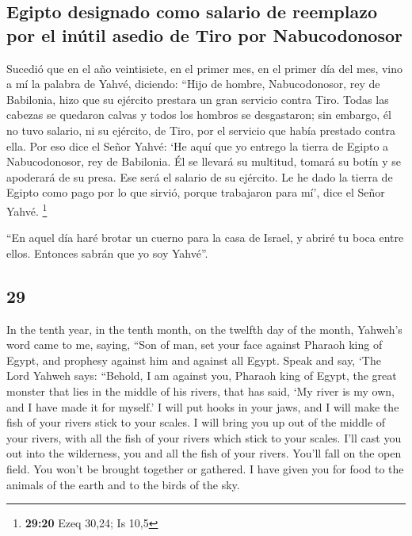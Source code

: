 \begin{paracol}{2}
\hypertarget{egipto-designado-como-salario-de-reemplazo-por-el-inuxfatil-asedio-de-tiro-por-nabucodonosor}{%
\subsection{Egipto designado como salario de reemplazo por el inútil
asedio de Tiro por
Nabucodonosor}\label{egipto-designado-como-salario-de-reemplazo-por-el-inuxfatil-asedio-de-tiro-por-nabucodonosor}}

 Sucedió que en el año veintisiete, en el primer mes, en
el primer día del mes, vino a mí la palabra de Yahvé, diciendo:
 ``Hijo de hombre, Nabucodonosor, rey de Babilonia, hizo
que su ejército prestara un gran servicio contra Tiro. Todas las cabezas
se quedaron calvas y todos los hombros se desgastaron; sin embargo, él
no tuvo salario, ni su ejército, de Tiro, por el servicio que había
prestado contra ella.  Por eso dice el Señor Yahvé: `He
aquí que yo entrego la tierra de Egipto a Nabucodonosor, rey de
Babilonia. Él se llevará su multitud, tomará su botín y se apoderará de
su presa. Ese será el salario de su ejército.  Le he dado
la tierra de Egipto como pago por lo que sirvió, porque trabajaron para
mí', dice el Señor Yahvé. \footnote{\textbf{29:20} Ezeq 30,24; Is 10,5}

 ``En aquel día haré brotar un cuerno para la casa de
Israel, y abriré tu boca entre ellos. Entonces sabrán que yo soy
Yahvé''.

\switchcolumn
\begin{otherlanguage}{english}

\hypertarget{section-57}{%
\section{29}\label{section-57}}

 In the tenth year, in the tenth month, on the twelfth day
of the month, Yahweh's word came to me, saying,  ``Son of
man, set your face against Pharaoh king of Egypt, and prophesy against
him and against all Egypt.  Speak and say, `The Lord
Yahweh says: ``Behold, I am against you, Pharaoh king of Egypt, the
great monster that lies in the middle of his rivers, that has said, `My
river is my own, and I have made it for myself.'  I will
put hooks in your jaws, and I will make the fish of your rivers stick to
your scales. I will bring you up out of the middle of your rivers, with
all the fish of your rivers which stick to your scales. 
I'll cast you out into the wilderness, you and all the fish of your
rivers. You'll fall on the open field. You won't be brought together or
gathered. I have given you for food to the animals of the earth and to
the birds of the sky.


\end{otherlanguage}
\end{paracol}
